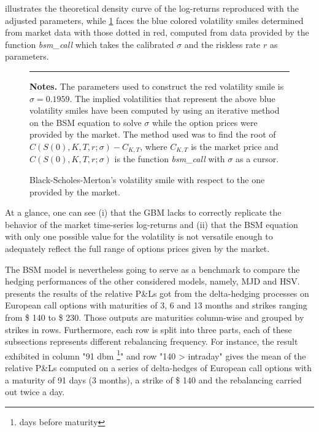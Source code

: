 \documentclass[12pt]{report}
\begin{document}
 illustrates the theoretical density curve of the log-returns reproduced with the adjusted parameters, while \cref{p:analysis:gbm:option:adjusted} faces the blue colored volatility smiles determined from market data with those dotted in red, computed from data provided by the function \textit{bsm\_call} which takes the calibrated $\sigma$ and the riskless rate $r$ as parameters.

\begin{figure}[h]
  \centering
  \rule{40mm}{20mm}
  \caption{Black-Scholes-Merton's volatility smile with respect to the one provided by the market.}
  \begin{changemargin}{0.5cm}{0.5cm}
  \medskip
\footnotesize
{}\textbf{Notes.} The parameters used to construct the red volatility smile is $\sigma =  0.1959$.
The implied volatilities that represent the above blue volatility smiles have been computed by using an iterative method on the BSM equation to solve  $\sigma$ while the option prices were provided by the market.
The method used was to find the root of $C(S(0), K, T, r; \sigma) - C_{K, T}$, where $C_{K, T}$ is the market price and $C(S(0), K, T, r; \sigma)$ is the function \textit{bsm\_call} with $\sigma$ as a cursor.
  \end{changemargin}
  \label{p:analysis:gbm:option:adjusted}
\end{figure}

At a glance, one can see (i) that the GBM lacks to correctly replicate the behavior of the market time-series log-returns and (ii) that the BSM equation with only one possible value for the volatility is not versatile enough to adequately reflect the full range of options prices given by the market.























The BSM model is nevertheless going to serve as a benchmark to compare the hedging performances of the other considered models, namely, MJD and HSV.
 presents the results of the relative P\&Ls got from the delta-hedging processes on European call options with maturities of 3, 6 and 13 months and strikes ranging from  \$ 140 to \$ 230.
Those outputs are maturities column-wise and grouped by strikes in rows.
Furthermore, each row is split into three parts, each of these subsections represents different rebalancing frequency.
For instance, the result exhibited in column "91 dbm \footnote{days before maturity}" and row "140 > intraday" gives the mean of the relative P\&Ls computed on a series of delta-hedges of European call options with a maturity of 91 days (3 months), a strike of  \$ 140 and the rebalancing carried out twice a day.
\end{document}
